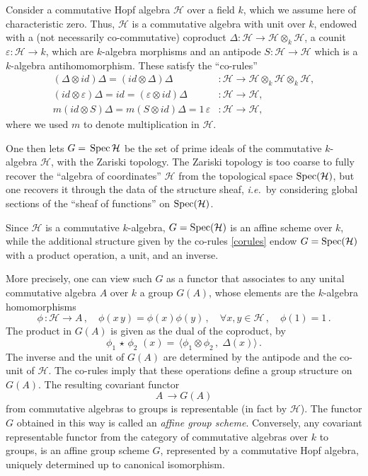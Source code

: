 \documentclass[10pt]{amsart}
\def\Hc{{\mathcal H}}
\def\ve{\varepsilon}
\def\qq{{\,,\quad \forall}}
\def\Sp{{\rm Spec}}
\newcommand{\ie}{{\it i.e.\/}\ }
\numberwithin{equation}{section}
\begin{document}
Consider a commutative Hopf algebra $\Hc$ over a field $k$, which
we assume here of characteristic zero. Thus, $\Hc$ is a
commutative algebra with unit over $k$, endowed with a (not
necessarily co-commutative) coproduct $\Delta: \Hc \to
\Hc\otimes_k \Hc$, a counit $\ve: \Hc \to k$, which are
$k$-algebra morphisms and an antipode $S: \Hc \to \Hc$ which is a
$k$-algebra antihomomorphism. These satisfy the ``co-rules''
\begin{equation}\label{corules}
 \begin{array}{ll}
(\Delta \otimes id)\Delta = (id\otimes \Delta)\Delta & : \Hc \to
\Hc\otimes_k \Hc \otimes_k \Hc , \\[2mm]
 (id\otimes \ve)\Delta =id = (\ve \otimes id)\Delta & : \Hc \to \Hc , \\[2mm]
 m (id \otimes S)\Delta = m (S\otimes id) \Delta = 1\,\ve & : \Hc \to \Hc,
\end{array} \end{equation}
where we used $m$ to denote multiplication in $\Hc$.

\smallskip

One then lets $G=\,{\rm Spec}\,\Hc$ be
the set of prime ideals of the commutative $k$-algebra $\Hc$, with the
Zariski topology. The Zariski topology is too coarse
to fully recover the ``algebra of coordinates'' $\Hc$ from the
topological space $\Sp(\Hc)$, but one recovers it through the
data of the structure sheaf, \ie by considering global sections of
the ``sheaf of functions'' on $\Sp(\Hc)$.

\smallskip

Since $\Hc$ is a commutative $k$-algebra, $G=\Sp(\Hc)$ is an
affine scheme over $k$, while the additional structure given by
the co-rules \eqref{corules} endow $G=\Sp(\Hc)$ with a product
operation, a unit, and an inverse.

\smallskip

More precisely, one can view such $G$ as a functor that associates
to any unital commutative algebra $A$ over $k$ a group $G(A)$,
whose elements are the $k$-algebra homomorphisms
$$
\phi \,: \Hc \to A\,,\quad \phi(x\,y)= \phi(x) \phi(y) \qq
x,y\in \Hc\,, \quad\phi(1)=1\,.
$$
The product in $G(A)$ is given as the dual of the coproduct, by
 \begin{equation} \label{dualprod}
 \phi_1\,\star\,\phi_2\,\,(x)=\,\langle  \phi_1\otimes
\phi_2\,,\;\Delta(x)\rangle\,.
 \end{equation}
The inverse and the unit of $G(A)$ are determined by the antipode
and the co-unit of $\Hc$. The co-rules imply that these operations
define a group structure on $G(A)$. The resulting covariant
functor
$$
A \,\rightarrow G(A)
$$
from commutative algebras to groups is representable (in fact by
$\Hc$). The functor $G$ obtained in this way is called an {\em
affine group scheme}. Conversely, any covariant representable
functor from the category of commutative algebras over $k$ to
groups, is an affine group scheme $G$, represented by a
commutative Hopf algebra, uniquely determined up to canonical
isomorphism.
\end{document}
